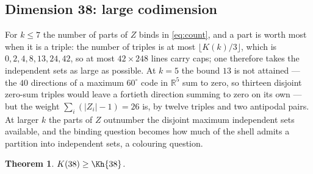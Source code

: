 \documentclass[11pt]{amsart}
\newtheorem{theorem}{Theorem}[section]
\theoremstyle{remark}
\newcommand{\R}{\mathbb{R}}
\begin{document}
\subsection{Dimension 38: large codimension}\label{ss:d38}

For $k\le7$ the number of parts of $Z$ binds in \eqref{eq:count}, and a part is
worth most when it is a triple: the number of triples is at most
$\lfloor K(k)/3\rfloor$, which is $0,2,4,8,13,24,42$, so at most $42\times248$
lines carry caps; one therefore takes the independent sets as large as possible.
At $k=5$ the bound $13$ is not attained --- the $40$ directions of a maximum
$60^{\circ}$ code in $\R^{5}$ sum to zero, so thirteen disjoint zero-sum triples
would leave a fortieth direction summing to zero on its own --- but the weight
$\sum_{i}(|Z_{i}|-1)=26$ is, by twelve triples and two antipodal pairs. At larger
$k$ the parts of $Z$ outnumber the disjoint maximum independent sets available,
and the binding question becomes how much of the shell admits a partition into
independent sets, a colouring question.

\begin{theorem}\label{thm:38}
$K(38)\ge\Kh{38}$.
\end{theorem}
\end{document}
